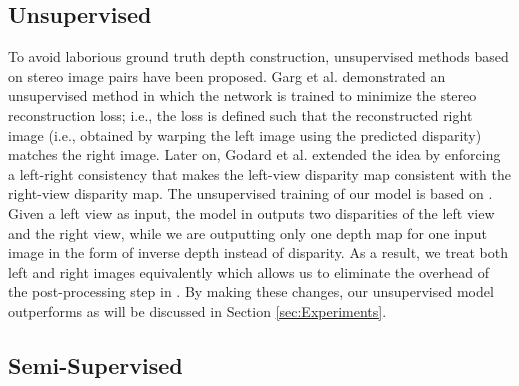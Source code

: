\documentclass[letterpaper, 10 pt, conference]{ieeeconf}
\begin{document}
\subsection{Unsupervised}\label{sec:unsupervised}
 To avoid laborious ground truth depth construction, unsupervised methods based on stereo image pairs have been proposed\cite{xie2016deep3d}. Garg et al. \cite{garg2016unsupervised} demonstrated an unsupervised method in which the network is trained to minimize the stereo reconstruction loss; i.e., the loss is defined such that the reconstructed right image (i.e., obtained by warping the left image using the predicted disparity) matches the right image. Later on, Godard et al.\cite{godard2017unsupervised} extended the idea by enforcing a left-right consistency that makes the left-view disparity map consistent with the right-view disparity map. The unsupervised training of our model is based on \cite{godard2017unsupervised}. Given a left view as input, the model in\cite{godard2017unsupervised} outputs two disparities of the left view and the right view, while we are outputting only one depth map for one input image in the form of inverse depth instead of disparity. As a result, we treat both left and right images equivalently which allows us to eliminate the overhead of the post-processing step in \cite{godard2017unsupervised}. By making these changes, our unsupervised model outperforms \cite{godard2017unsupervised} as will be discussed in Section \ref{sec:Experiments}.



 \subsection{Semi-Supervised}\label{sec:monoslam}
\end{document}
